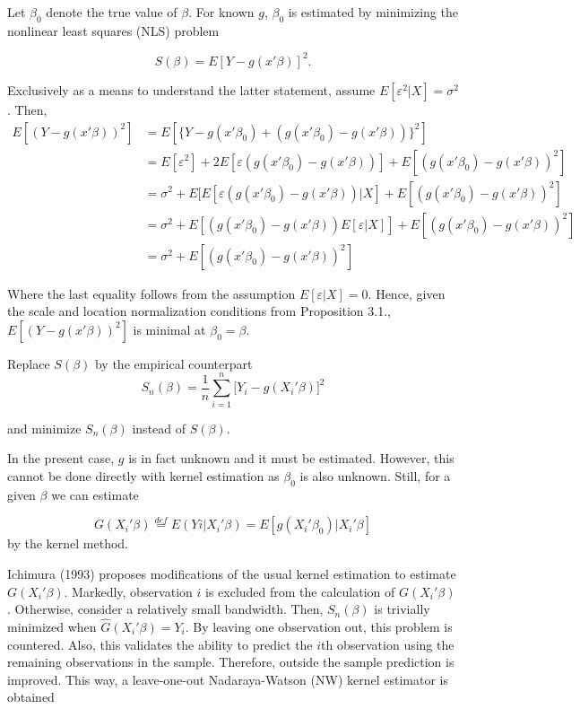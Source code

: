 \documentclass[a4paper]{article}
\begin{document}
Let $\beta_0$ denote the true value of $\beta$. For known $g$, $\beta_0$ is estimated by minimizing the nonlinear least squares (NLS) problem

\[
S(\beta) = E[Y - g(x'\beta)]^2. \]

Exclusively as a means to understand the latter statement, assume $E[\varepsilon^2|X]=\sigma^2$. Then,
\begin{align*}
E[(Y - g(x'\beta))^2] & = E[\{Y - g(x'\beta_0) + (g(x'\beta_0) - g(x'\beta))\}^2]\\
                   & = E[\varepsilon^2] + 2E[\varepsilon (g(x'\beta_0) - g(x'\beta)) ] + E[(g(x'\beta_0) - g(x'\beta))^2]\\                 & = \sigma^2 + E[E[\varepsilon (g(x'\beta_0) - g(x'\beta))|X] + E[(g(x'\beta_0) - g(x'\beta))^2]  \\
                   &= \sigma^2 + E[(g(x'\beta_0) - g(x'\beta))E[\varepsilon|X]] + E[(g(x'\beta_0) - g(x'\beta))^2] \\
                   &= \sigma^2 + E[(g(x'\beta_0) - g(x'\beta))^2]
\end{align*}

Where the last equality follows from the assumption $E[\varepsilon|X]=0$. Hence, given the scale and location normalization conditions from Proposition 3.1., $E[(Y - g(x'\beta))^2]$ is minimal at $\beta_0 = \beta$.

Replace $S(\beta)$ by the empirical counterpart 
\begin{equation}
S_n(\beta) = \frac{1}{n}\sum_{i = 1}^n\big[Y_i - g(X_i'\beta)\big]^2
\end{equation}

and minimize $S_n(\beta)$ instead of $S(\beta)$.


In the present case, $g$ is in fact unknown and it must be estimated. However, this cannot be done directly with kernel estimation as $\beta_0$ is also unknown. Still, for a given $\beta$ we can estimate

\begin{equation}
G(X_i'\beta) \stackrel{def}{=} E(Yi|X_i'\beta) = E[g(X_i'\beta_0)|X_i'\beta]
\end{equation}
 by the kernel method. 

Ichimura (1993) proposes modifications of the usual kernel estimation to estimate $G(X_i'\beta)$. Markedly, observation $i$ is excluded from the calculation of $G(X_i'\beta)$. Otherwise, consider a relatively small bandwidth. Then, $S_n(\beta)$ is trivially minimized when $\hat{G}(X_i'\beta) = Y_i$. By leaving one observation out, this problem is countered. Also, this validates the ability to predict the $i$th observation using the remaining observations in the sample. Therefore, outside the sample prediction is improved. This way, a leave-one-out Nadaraya-Watson (NW) kernel estimator is obtained
\end{document}
